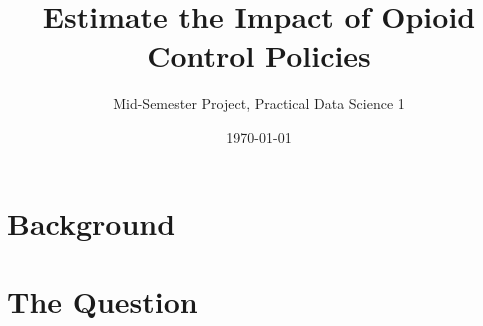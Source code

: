 \documentclass[12pt]{article}
\title{Estimate the Impact of Opioid Control Policies}
\author{Mid-Semester Project, Practical Data Science 1}
\date{\today}
\begin{document}
\maketitle

\section*{Background}

\section*{The Question}
\end{document}
